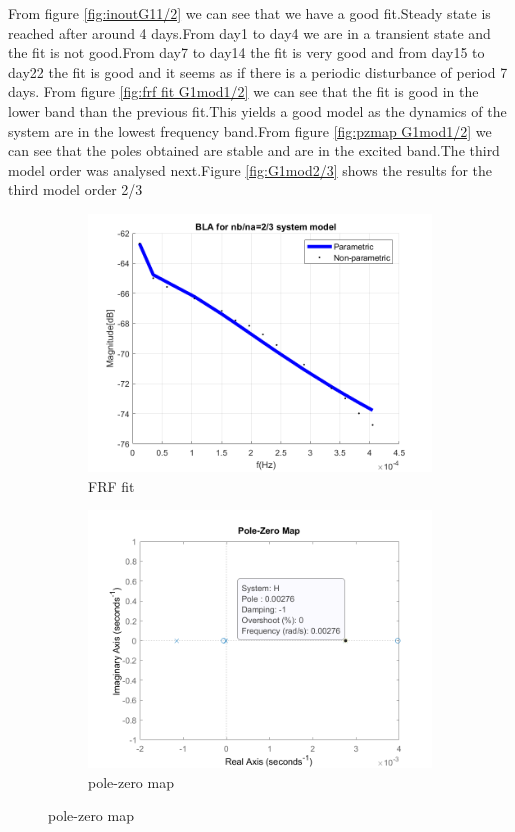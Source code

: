 \documentclass[a4paper,12pt]{article}
\numberwithin{equation}{section}
\begin{document}
\noindent
From figure \ref{fig:inoutG11/2} we can see that we have a good fit.Steady state is reached after around 4 days.From day1 to day4 we are in a transient state and the fit is not good.From day7 to day14 the fit is very good and from day15 to day22 the fit is good and it seems as if there is a periodic disturbance of period 7 days. From figure \ref{fig:frf fit G1mod1/2} we can see that the fit is good in the lower band than the previous fit.This yields a good model as the dynamics of the system are in the lowest frequency band.From figure \ref{fig:pzmap G1mod1/2} we can see that the poles obtained are stable and are in the excited band.The third model order was analysed next.Figure \ref{fig:G1mod2/3} shows the results for the third model order 2/3 


\begin{figure}[H]
\centering
\begin{subfigure}{.5\textwidth}
  \centering
  \includegraphics[width=.7\linewidth]{G1mod23FrfFit.png}
  \caption{FRF fit}
  \label{fig:frf fit G1mod2/3}
\end{subfigure}%
\begin{subfigure}{.5\textwidth}
  \centering
  \includegraphics[width=.7\linewidth]{G1mod23pzmap.png}
  \caption{pole-zero map}
  \label{fig:pzmap G1mod2/3}
\end{subfigure}


\end{figure}
\end{document}
